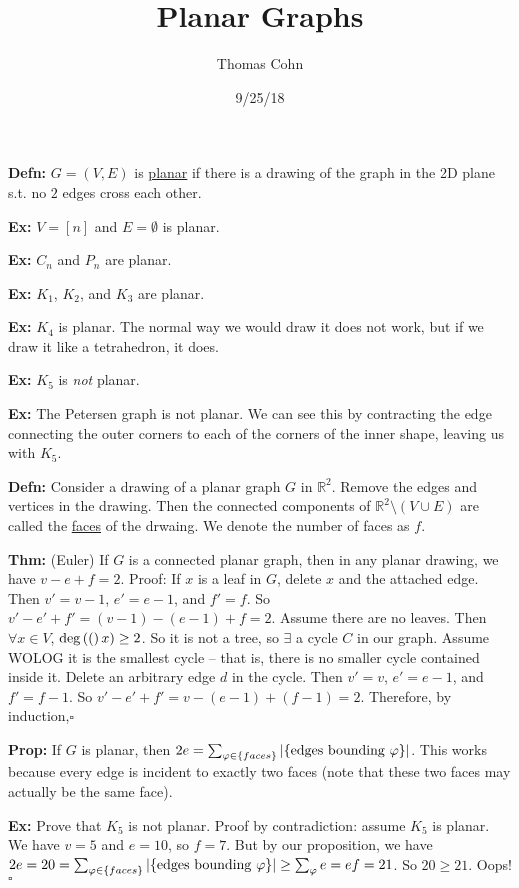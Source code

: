 \documentclass[10pt,letterpaper]{article}
\author{Thomas Cohn}
\title{Planar Graphs}
\date{9/25/18} %
\newcommand{\n}{\hfill\break}
\newcommand{\defn}[1]{\par\noindent\settowidth{\hangindent}{\textbf{Defn: }}\textbf{Defn: }#1\n}
\newcommand{\thm}[1]{\par\noindent\settowidth{\hangindent}{\textbf{Thm: }}\textbf{Thm: }#1\n}
\newcommand{\prop}[1]{\par\noindent\settowidth{\hangindent}{\textbf{Prop: }}\textbf{Prop: }#1\n}
\newcommand{\ex}[1]{\par\noindent\settowidth{\hangindent}{\textbf{Ex: }}\textbf{Ex: }#1\n}
\newcommand{\proven}{\;$\square$\n}
\newcommand{\ptxt}[1]{\textrm{\textnormal{#1}}}
\newcommand{\card}[1]{\left|#1\right|}
\newcommand{\set}[1]{\left\{#1\right\}}
\newcommand{\reals}{\mathbb{R}}
\newcommand{\R}{\reals}
\renewcommand{\deg}[1]{\ptxt{deg}\left(#1\right)}
\newcommand{\st}{s.t.}
\begin{document}
\maketitle
\setlength\RaggedRightParindent{\parindent}
\RaggedRight

\defn{$G=(V,E)$ is \underline{planar} if there is a drawing of the graph in the 2D plane \st{} no $2$ edges cross each other.}

\ex{$V=[n]$ and $E=\emptyset$ is planar.}

\ex{$C_{n}$ and $P_{n}$ are planar.}

\ex{$K_{1}$, $K_{2}$, and $K_{3}$ are planar.}

\ex{$K_{4}$ is planar. The normal way we would draw it does not work, but if we draw it like a tetrahedron, it does.}

\ex{$K_{5}$ is \textit{not} planar.}

\ex{The Petersen graph is not planar. We can see this by contracting the edge connecting the outer corners to each of the corners of the inner shape, leaving us with $K_{5}$.}

\defn{Consider a drawing of a planar graph $G$ in $\R^{2}$. Remove the edges and vertices in the drawing. Then the connected components of $\R^{2}\setminus(V\cup{}E)$ are called the \underline{faces} of the drwaing. We denote the number of faces as $f$.}

\thm{(Euler) If $G$ is a connected planar graph, then in any planar drawing, we have $v-e+f=2$.\n
Proof: If $x$ is a leaf in $G$, delete $x$ and the attached edge. Then $v'=v-1$, $e'=e-1$, and $f'=f$. So $v'-e'+f'=(v-1)-(e-1)+f=2$.\n
Assume there are no leaves. Then $\forall{}x\in{}V$, $\deg(x)\ge{}2$. So it is not a tree, so $\exists$ a cycle $C$ in our graph. Assume WOLOG it is the smallest cycle -- that is, there is no smaller cycle contained inside it. Delete an arbitrary edge $d$ in the cycle. Then $v'=v$, $e'=e-1$, and $f'=f-1$. So $v'-e'+f'=v-(e-1)+(f-1)=2$.\n
Therefore, by induction,\proven}

\prop{If $G$ is planar, then $2e=\sum_{\varphi\in\set{faces}}\card{\set{\ptxt{edges bounding }\varphi}}$. This works because every edge is incident to exactly two faces (note that these two faces may actually be the same face).}

\ex{Prove that $K_{5}$ is not planar.\n
Proof by contradiction: assume $K_{5}$ is planar. We have $v=5$ and $e=10$, so $f=7$. But by our proposition, we have $2e=20=\sum_{\varphi\in\set{faces}}\card{\set{\ptxt{edges bounding }\varphi}}\ge\sum_{\varphi}e=ef=21$. So $20\ge{}21$. Oops!\proven}
\end{document}
